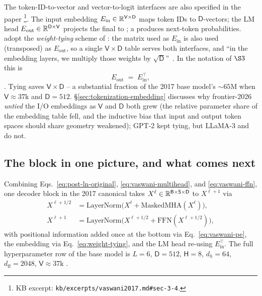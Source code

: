 The token-ID-to-vector and vector-to-logit interfaces are also
specified in the paper%
\footnote{KB excerpt: \texttt{kb/excerpts/vaswani2017.md\#sec-3-4}.}.
The input embedding $E_{\text{in}} \in \mathbb{R}^{\mathsf{V} \times \mathsf{D}}$
maps token IDs to $\mathsf{D}$-vectors; the LM head
$E_{\text{out}} \in \mathbb{R}^{\mathsf{D} \times \mathsf{V}}$ projects the
final  to  ; a  produces
next-token probabilities. \citet{vaswani2017} adopt the
\emph{weight-tying} scheme of \citet{press2017-tied-embed}: the
matrix used as $E_{\text{in}}$ is also used (transposed) as
$E_{\text{out}}$, so a single $\mathsf{V} \times \mathsf{D}$ table
serves both interfaces, and ``in the embedding layers, we multiply
those weights by $\sqrt{\mathsf{D}}$''~\citep[\S 3.4]{vaswani2017}. In
the notation of $\S 3$ this is
\begin{equation}
  E_{\text{out}} \;=\; E_{\text{in}}^{\!\top},
  \tag{Press--Vaswani tying}
  \label{eq:weight-tying}
\end{equation}
\citep{press2017-tied-embed}. Tying saves $\mathsf{V} \times \mathsf{D}$
 -- a substantial fraction of the 2017 base model's $\sim 65$M
 when $\mathsf{V} \approx 37\text{k}$ and $\mathsf{D} = 512$.
\S\ref{sec:tokenization-embedding} discusses why frontier-2026
\emph{untied} the I/O embeddings as $\mathsf{V}$ and $\mathsf{D}$ both
grew (the relative parameter share of the embedding table fell, and
the inductive bias that input and output token spaces should share
geometry weakened); GPT-2 \citep[\S 2.3]{radford2019-gpt2} kept
tying, but LLaMA-3 and  do not.

\subsection{The block in one picture, and what comes next}
\label{sec:canonical-block-picture}

Combining Eqs.~\eqref{eq:post-ln-original}, \eqref{eq:vaswani-multihead},
and \eqref{eq:vaswani-ffn}, one decoder block in the 2017 canonical
takes  $X^\ell \in \mathbb{R}^{\mathsf{B} \times \mathsf{S} \times \mathsf{D}}$
to $X^{\ell+1}$ via
\begin{align}
  X^{\ell + 1/2} &= \mathrm{LayerNorm}\!\bigl(X^\ell + \mathrm{MaskedMHA}(X^\ell)\bigr),
  \\
  X^{\ell + 1}   &= \mathrm{LayerNorm}\!\bigl(X^{\ell + 1/2} + \mathrm{FFN}(X^{\ell + 1/2})\bigr),
\end{align}
with positional information added once at the bottom via
Eq.~\eqref{eq:vaswani-pe}, the embedding via
Eq.~\eqref{eq:weight-tying}, and the LM head re-using
$E_{\text{in}}^\top$. The full hyperparameter row of the base
model is $L = 6$, $\mathsf{D} = 512$, $\mathsf{H} = 8$,
$d_h = 64$, $d_{\text{ff}} = 2048$, $\mathsf{V} \approx 37\text{k}$
\citep[\S 3.1, \S 5.1]{vaswani2017}.

